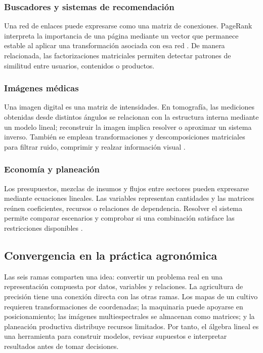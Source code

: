 \documentclass[spanish,letterpaper,oneside]{article}
\begin{document}
\subsubsection{Buscadores y sistemas de recomendación}
Una red de enlaces puede expresarse como una matriz de conexiones. PageRank interpreta la importancia de una página mediante un vector que permanece estable al aplicar una transformación asociada con esa red \citep{page1999pagerank}. De manera relacionada, las factorizaciones matriciales permiten detectar patrones de similitud entre usuarios, contenidos o productos.

\subsubsection{Imágenes médicas}
Una imagen digital es una matriz de intensidades. En tomografía, las mediciones obtenidas desde distintos ángulos se relacionan con la estructura interna mediante un modelo lineal; reconstruir la imagen implica resolver o aproximar un sistema inverso. También se emplean transformaciones y descomposiciones matriciales para filtrar ruido, comprimir y realzar información visual \citep{gonzalez2018digital,meyer2000matrix}.

\subsubsection{Economía y planeación}
Los presupuestos, mezclas de insumos y flujos entre sectores pueden expresarse mediante ecuaciones lineales. Las variables representan cantidades y las matrices reúnen coeficientes, recursos o relaciones de dependencia. Resolver el sistema permite comparar escenarios y comprobar si una combinación satisface las restricciones disponibles \citep{lay2021linear}.

\subsection{Convergencia en la práctica agronómica}
Las seis ramas comparten una idea: convertir un problema real en una representación compuesta por datos, variables y relaciones. La agricultura de precisión tiene una conexión directa con las otras ramas. Los mapas de un cultivo requieren transformaciones de coordenadas; la maquinaria puede apoyarse en posicionamiento; las imágenes multiespectrales se almacenan como matrices; y la planeación productiva distribuye recursos limitados. Por tanto, el álgebra lineal es una herramienta para construir modelos, revisar supuestos e interpretar resultados antes de tomar decisiones.
\end{document}
